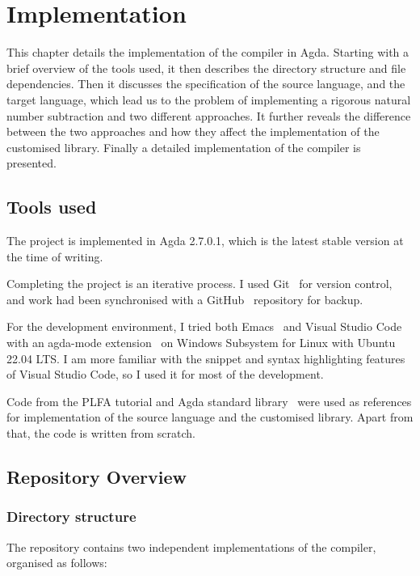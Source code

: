 \documentclass[12pt,a4paper]{report}
\theoremstyle{definition}
\begin{document}
\chapter{Implementation} \label{chap: implementation}
    \minitoc
    This chapter details the implementation of the compiler in Agda. Starting with a brief overview of the tools used, it then describes the directory structure and file dependencies. Then it discusses the specification of the source language, and the target language, which lead us to the problem of implementing a rigorous natural number subtraction and two different approaches. It further reveals the difference between the two approaches and how they affect the implementation of the customised library. Finally a detailed implementation of the compiler is presented.
    

    \section{Tools used}
    The project is implemented in Agda 2.7.0.1, which is the latest stable version at the time of writing.

    Completing the project is an iterative process. I used Git~\autocite{git} for version control, and work had been synchronised with a GitHub~\autocite{github} repository for backup.

    For the development environment, I tried both Emacs~\autocite{emacs} and Visual Studio Code~\autocite{vscode} with an agda-mode extension~\autocite{agda_mode} on Windows Subsystem for Linux with Ubuntu~\autocite{wsl_ubuntu} 22.04 LTS. I am more familiar with the snippet and syntax highlighting features of Visual Studio Code, so I used it for most of the development. 

    Code from the PLFA tutorial and Agda standard library~\autocite{agda_std} were used as references for implementation of the source language and the customised library. Apart from that, the code is written from scratch.

    \section{Repository Overview}
        \subsection{Directory structure}
        The repository contains two independent implementations of the compiler, organised as follows:
\end{document}
